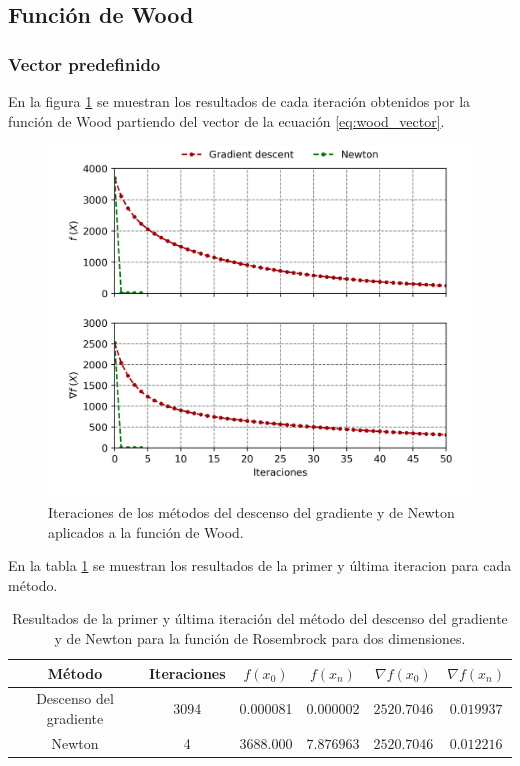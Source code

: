 
\subsection{Función de Wood}

\subsubsection{Vector predefinido}

En la figura \ref{fig:wood} se muestran los resultados de cada iteración obtenidos por la función de Wood partiendo del vector de la ecuación \ref{eq:wood_vector}.

\begin{figure}[H]
    \centering
    \includegraphics[width=12cm]{Graphics/Problema_2/wood_4_predefined.png}
    \caption{Iteraciones de los métodos del descenso del gradiente y de Newton aplicados a la función de Wood.}
    \label{fig:wood}
\end{figure}

En la tabla \ref{table:wood_predefined} se muestran los resultados de la primer y última iteracion para cada método.

\begin{table}[H]
    \centering
    \begin{tabular}{cccccc} \hline
        Método                 & Iteraciones & $f(x_0)$ & $f(x_n)$   & $\nabla f(x_0)$ & $\nabla f(x_n) $ \\ \hline
        Descenso del gradiente & 3094        & 0.000081 & $0.000002$ & $2520.7046$     & $0.019937$       \\
        Newton                 & 4           & 3688.000 & $7.876963$ & $2520.7046$     & $0.012216$       \\ \hline
    \end{tabular}
    \caption{Resultados de la primer y última iteración del método del descenso del gradiente y de Newton para la función de Rosembrock para dos dimensiones.}
    \label{table:wood_predefined}
\end{table}

